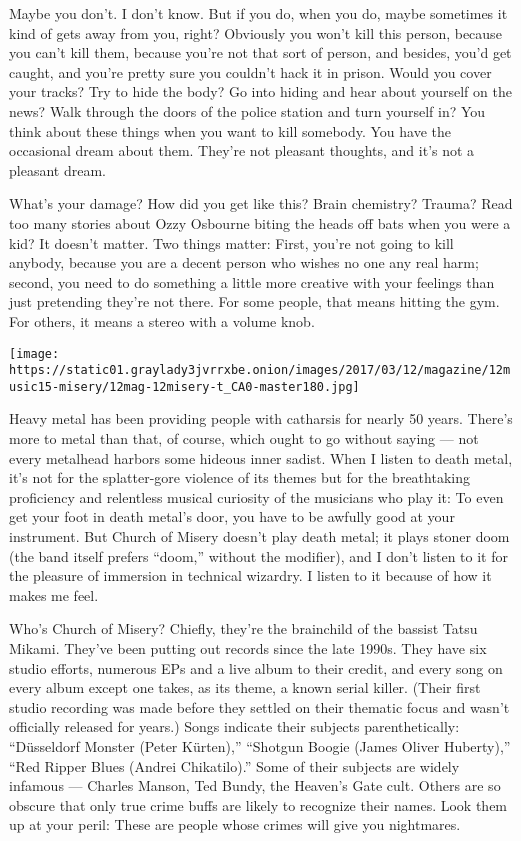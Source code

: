 Maybe you don't. I don't know. But if you do, when you do, maybe
sometimes it kind of gets away from you, right? Obviously you won't kill
this person, because you can't kill them, because you're not that sort
of person, and besides, you'd get caught, and you're pretty sure you
couldn't hack it in prison. Would you cover your tracks? Try to hide the
body? Go into hiding and hear about yourself on the news? Walk through
the doors of the police station and turn yourself in? You think about
these things when you want to kill somebody. You have the occasional
dream about them. They're not pleasant thoughts, and it's not a pleasant
dream.

What's your damage? How did you get like this? Brain chemistry? Trauma?
Read too many stories about Ozzy Osbourne biting the heads off bats when
you were a kid? It doesn't matter. Two things matter: First, you're not
going to kill anybody, because you are a decent person who wishes no one
any real harm; second, you need to do something a little more creative
with your feelings than just pretending they're not there. For some
people, that means hitting the gym. For others, it means a stereo with a
volume knob.

\texttt{[image: https://static01.graylady3jvrrxbe.onion/images/2017/03/12/magazine/12music15-misery/12mag-12misery-t\_CA0-master180.jpg]}

Heavy metal has been providing people with catharsis for nearly 50
years. There's more to metal than that, of course, which ought to go
without saying --- not every metalhead harbors some hideous inner
sadist. When I listen to death metal, it's not for the splatter-gore
violence of its themes but for the breathtaking proficiency and
relentless musical curiosity of the musicians who play it: To even get
your foot in death metal's door, you have to be awfully good at your
instrument. But Church of Misery doesn't play death metal; it plays
stoner doom (the band itself prefers ``doom,'' without the modifier),
and I don't listen to it for the pleasure of immersion in technical
wizardry. I listen to it because of how it makes me feel.

Who's Church of Misery? Chiefly, they're the brainchild of the bassist
Tatsu Mikami. They've been putting out records since the late 1990s.
They have six studio efforts, numerous EPs and a live album to their
credit, and every song on every album except one takes, as its theme, a
known serial killer. (Their first studio recording was made before they
settled on their thematic focus and wasn't officially released for
years.) Songs indicate their subjects parenthetically: ``Düsseldorf
Monster (Peter Kürten),'' ``Shotgun Boogie (James Oliver Huberty),''
``Red Ripper Blues (Andrei Chikatilo).'' Some of their subjects are
widely infamous --- Charles Manson, Ted Bundy, the Heaven's Gate cult.
Others are so obscure that only true crime buffs are likely to recognize
their names. Look them up at your peril: These are people whose crimes
will give you nightmares.

